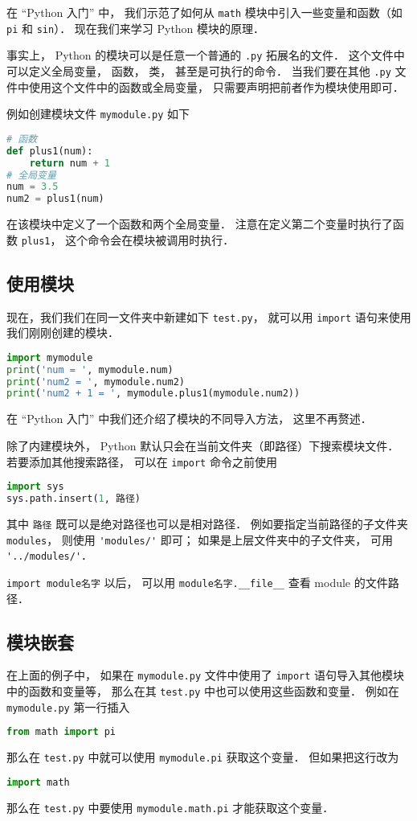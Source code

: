 

在 “Python 入门” 中， 我们示范了如何从 \verb|math| 模块中引入一些变量和函数（如 \verb|pi| 和 \verb|sin|）． 现在我们来学习 Python 模块的原理．

事实上， Python 的模块可以是任意一个普通的 \verb|.py| 拓展名的文件． 这个文件中可以定义全局变量， 函数， 类， 甚至是可执行的命令． 当我们要在其他 \verb|.py| 文件中使用这个文件中的函数或全局变量， 只需要声明把前者作为模块使用即可．

例如创建模块文件 \verb|mymodule.py| 如下
\begin{lstlisting}[language=python]
# 函数
def plus1(num):
    return num + 1
# 全局变量
num = 3.5
num2 = plus1(num)
\end{lstlisting}
在该模块中定义了一个函数和两个全局变量． 注意在定义第二个变量时执行了函数 \verb|plus1|， 这个命令会在模块被调用时执行．

\subsection{使用模块}
现在，我们我们在同一文件夹中新建如下 \verb|test.py|， 就可以用 \verb|import| 语句来使用我们刚刚创建的模块．
\begin{lstlisting}[language=python]
import mymodule
print('num = ', mymodule.num)
print('num2 = ', mymodule.num2)
print('num2 + 1 = ', mymodule.plus1(mymodule.num2))
\end{lstlisting}
在 “Python 入门” 中我们还介绍了模块的不同导入方法， 这里不再赘述．

除了内建模块外， Python 默认只会在当前文件夹（即路径）下搜索模块文件． 若要添加其他搜索路径， 可以在 \verb|import| 命令之前使用
\begin{lstlisting}[language=python]
import sys
sys.path.insert(1, 路径)
\end{lstlisting}
其中 \verb|路径| 既可以是绝对路径也可以是相对路径． %
例如要指定当前路径的子文件夹 \verb|modules|， 则使用 \verb|'modules/'| 即可； 如果是上层文件夹中的子文件夹， 可用 \verb|'../modules/'|．

\verb|import module名字| 以后， 可以用 \verb|module名字.__file__| 查看 module 的文件路径．

\subsection{模块嵌套}
在上面的例子中， 如果在 \verb|mymodule.py| 文件中使用了 \verb|import| 语句导入其他模块中的函数和变量等， 那么在其 \verb|test.py| 中也可以使用这些函数和变量． 例如在 \verb|mymodule.py| 第一行插入
\begin{lstlisting}[language=python]
from math import pi
\end{lstlisting}
那么在 \verb|test.py| 中就可以使用 \verb|mymodule.pi| 获取这个变量． 但如果把这行改为
\begin{lstlisting}[language=python]
import math
\end{lstlisting}
那么在 \verb|test.py| 中要使用 \verb|mymodule.math.pi| 才能获取这个变量．

